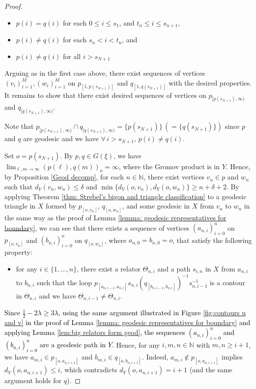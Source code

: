 \documentclass{article}[11pt]
\newcommand{\N}{\mathbb{N}}
\begin{document}
{\begin{proof}
    \begin{itemize}
        \item $p(i) = q(i)$ for each $0 \leq i \leq s_1$, and $t_n \leq i \leq s_{n+1}$, 
        \item $p(i) \neq q(i)$ for each $s_n < i < t_n$, and 
        \item $p(i) \neq q(i)$ for all $i > s_{N+1}$
    \end{itemize}
    
    Arguing as in the first case above, there exist sequences of vertices $(v_i)_{i=1}^M, (w_i)_{i=1}^M$ on $p_{[1, p(s_{N+1})]}$ and $q_{[1, q(s_{N+1})]}$ with the desired properties. It remains to show that there exist desired sequences of vertices on $p_{[p(s_{N+1}), \infty) }$ and $q_{[q(s_{N+1}), \infty)}$. {\color{black} Note that $p_{[p(s_{N+1}), \infty) } \cap q_{[q(s_{N+1}), \infty)} = \{p(s_{N+1})\} \,(=\{q(s_{N+1})\})$ since $p$ and $q$ are geodesic and we have $\forall\, i > s_{N+1},\, p(i) \neq q(i)$.

    Set $o = p(s_{N+1})$. By $p, q \in G(\xi)$, we have $\lim_{\ell,m \to \infty}(p(\ell),q(m))_o = \infty$, where the Gromov product is in $Y$. Hence, by Proposition \ref{Geod decomp}, for each $n \in \N$, there exist vertices $v_n \in p$ and $w_n$ such that $d_Y(v_n,w_n) \le \delta$ and $\min\{d_Y(o,v_n), d_Y(o,w_n)\} \ge n+\delta+2$. By applying Theorem \ref{thm: Strebel's bigon and triangle classification} to a geodesic triangle in $X$ formed by $p_{[o,v_n]}$, $q_{[o,w_n]}$, and some geodesic in $X$ from $v_n$ to $w_n$ in the same way as the proof of Lemma \ref{lemma: geodesic representatives for boundary}, we can see that there exists a sequence of vertices $(a_{n,i})_{i = 0}^{n}$ on $p_{[o,v_n]}$ and $(b_{n,i})_{i = 0}^{n}$ on $q_{[o,w_n]}$, where $a_{n,0}=b_{n,0}=o$, that satisfy the following property:
    \begin{itemize}
        \item[($\ast$)]for any $i \in \{1,\ldots,n\}$, there exist a relator $\Theta_{n,i}$ and a path $s_{i,n}$ in $X$ from $a_{n,i}$ to $b_{n,i}$ such that the loop $p_{[a_{n,i-1},a_{n,i}]}s_{n,i}(q_{[b_{n,i-1},b_{n,i}]})^{-1}s_{n,i-1}^{-1}$ is a contour in $\Theta_{n,i}$ and we have $\Theta_{n,i-1} \neq \Theta_{n,i}$.
    \end{itemize}
    
    \textcolor{black}{Since $\frac12 - 2\lambda\ge 3\lambda$, using the same argument illustrated in Figure \ref{fig:contours u and v} in the proof of Lemma \ref{lemma: geodesic representatives for boundary} and applying Lemma \ref{lem:big relators form geod}, the sequences $(a_{n,i})_{i = 0}^{n}$ and $(b_{n,i})_{i = 0}^{n}$ are a geodesic path in $Y$.} Hence, for any $i,m,n \in \N$ with $m,n \ge i+1$, we have $a_{m,i} \in p_{[o,a_{n,i+1}]}$ and $b_{m,i} \in q_{[o,b_{n,i+1}]}$. Indeed, $a_{m,i} \notin p_{[o,a_{n,i+1}]}$ implies $d_Y(o,a_{n,i+1}) \le i$, which contradicts $d_Y(o,a_{n,i+1}) = i+1$ (and the same argument holds for $q$). 
    
}
\end{proof}}
\end{document}
